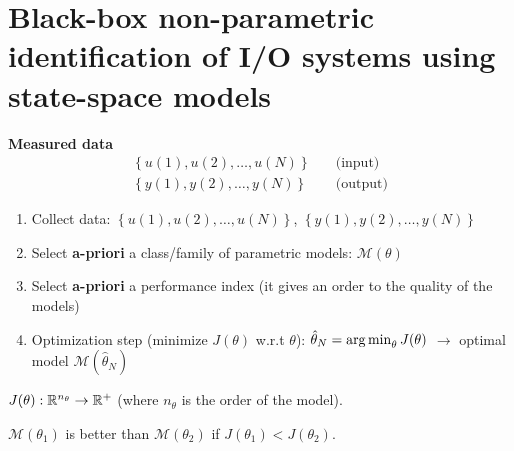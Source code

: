 \chapter{Black-box non-parametric identification of I/O systems using state-space models}

\begin{figure}[H]
    \centering
\end{figure}

\textbf{Measured data}
\begin{align*}
    \left\{u(1), u(2), \ldots, u(N)\right\} &\quad \text{(input)} \\
    \left\{y(1), y(2), \ldots, y(N)\right\} &\quad \text{(output)}
\end{align*}

\begin{rem}

\begin{enumerate}
    \item Collect data: $\left\{u(1), u(2), \ldots, u(N)\right\}$, $\left\{y(1), y(2), \ldots, y(N)\right\}$
    \item Select \textbf{a-priori} a class/family of parametric models: $\mathcal{M}(\theta)$
    \item Select \textbf{a-priori} a performance index (it gives an order to the quality of the models)
    \item Optimization step (minimize $J(\theta)$ w.r.t $\theta$): $\hat{\theta}_N = \operatorname*{arg\,min}_\theta J(\theta)$ $\rightarrow$ optimal model $\mathcal{M}(\hat{\theta}_N)$
\end{enumerate}

$J(\theta): \mathbb{R}^{n_\theta} \rightarrow \mathbb{R}^+$ (where $n_\theta$ is the order of the model).

$\mathcal{M}(\theta_1)$ is better than $\mathcal{M}(\theta_2)$ if $J(\theta_1) < J(\theta_2)$.

\end{rem}

